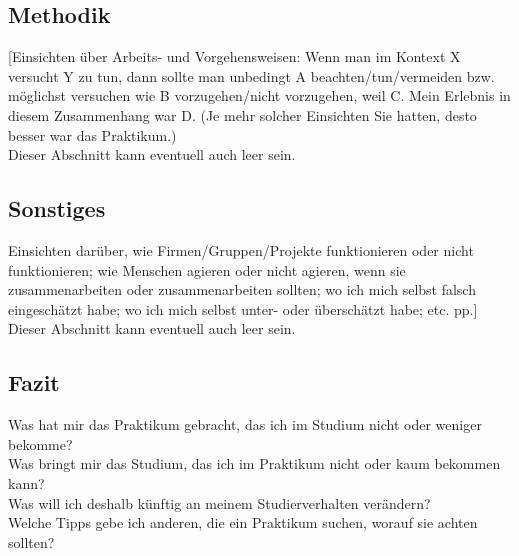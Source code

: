 \documentclass[pdftex,12pt,a4paper]{scrreprt}
\begin{document}
\subsection{Methodik}
[Einsichten über Arbeits- und Vorgehensweisen: Wenn man im Kontext X versucht Y zu
tun, dann sollte man unbedingt A beachten/tun/vermeiden bzw. möglichst versuchen wie
B vorzugehen/nicht vorzugehen, weil C. Mein Erlebnis in diesem Zusammenhang war D.
(Je mehr solcher Einsichten Sie hatten, desto besser war das Praktikum.)\\
Dieser Abschnitt kann eventuell auch leer sein.

\subsection{Sonstiges}
Einsichten darüber, wie Firmen/Gruppen/Projekte funktionieren oder nicht funktionieren;
wie Menschen agieren oder nicht agieren, wenn sie zusammenarbeiten oder
zusammenarbeiten sollten; wo ich mich selbst falsch eingeschätzt habe; wo ich mich
selbst unter- oder überschätzt habe; etc. pp.]\\
Dieser Abschnitt kann eventuell auch leer sein.

\subsection{Fazit}
Was hat mir das Praktikum gebracht, das ich im Studium nicht oder weniger bekomme?\\
Was bringt mir das Studium, das ich im Praktikum nicht oder kaum bekommen kann?\\
Was will ich deshalb künftig an meinem Studierverhalten verändern?\\
Welche Tipps gebe ich anderen, die ein Praktikum suchen, worauf sie achten sollten?\\

\appendix

\end{document}
